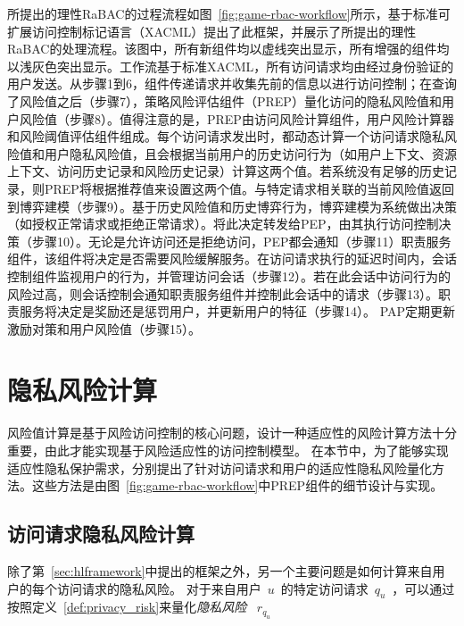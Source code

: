 所提出的理性RaBAC的过程流程如图~\ref{fig:game-rbac-workflow}所示，基于标准可扩展访问控制标记语言（XACML）提出了此框架，并展示了所提出的理性RaBAC的处理流程。该图中，所有新组件均以虚线突出显示，所有增强的组件均以浅灰色突出显示。工作流基于标准XACML，所有访问请求均由经过身份验证的用户发送。从步骤1到6，组件传递请求并收集先前的信息以进行访问控制；在查询了风险值之后（步骤7），策略风险评估组件（PREP）量化访问的隐私风险值和用户风险值（步骤8）。值得注意的是，PREP由访问风险计算组件，用户风险计算器和风险阈值评估组件组成。每个访问请求发出时，都动态计算一个访问请求隐私风险值和用户隐私风险值，且会根据当前用户的历史访问行为（如用户上下文、资源上下文、访问历史记录和风险历史记录）计算这两个值。若系统没有足够的历史记录，则PREP将根据推荐值来设置这两个值。与特定请求相关联的当前风险值返回到博弈建模（步骤9）。基于历史风险值和历史博弈行为，博弈建模为系统做出决策（如授权正常请求或拒绝正常请求）。将此决定转发给PEP，由其执行访问控制决策（步骤10）。无论是允许访问还是拒绝访问，PEP都会通知（步骤11）职责服务组件，该组件将决定是否需要风险缓解服务。在访问请求执行的延迟时间内，会话控制组件监视用户的行为，并管理访问会话（步骤12）。若在此会话中访问行为的风险过高，则会话控制会通知职责服务组件并控制此会话中的请求（步骤13）。职责服务将决定是奖励还是惩罚用户，并更新用户的特征（步骤14）。 PAP定期更新激励对策和用户风险值（步骤15）。

\section{隐私风险计算}
\label{sec:riskvalue}

风险值计算是基于风险访问控制的核心问题，设计一种适应性的风险计算方法十分重要，由此才能实现基于风险适应性的访问控制模型。 在本节中，为了能够实现适应性隐私保护需求，分别提出了针对访问请求和用户的适应性隐私风险量化方法。这些方法是由图~\ref{fig:game-rbac-workflow}中PREP组件的细节设计与实现。

\subsection{访问请求隐私风险计算}

除了第~\ref{sec:hlframework}中提出的框架之外，另一个主要问题是如何计算来自用户的每个访问请求的隐私风险。 对于来自用户~$u$~的特定访问请求~$q_u$~，可以通过按照定义~\ref{def:privacy_risk}来量化\emph{隐私风险} ~$r_{q_u}$~

